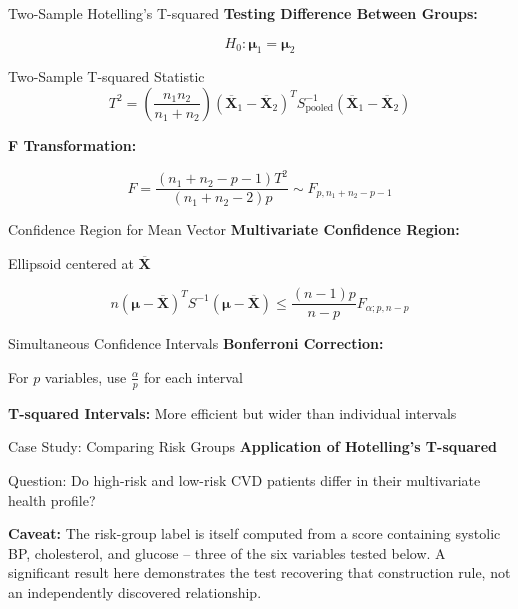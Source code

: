 \documentclass[aspectratio=169,ignorenonframetext]{beamer}
\begin{document}
\begin{frame}{Two-Sample Hotelling's T-squared}
\textbf{Testing Difference Between Groups:}

\[H_{0}:\mathbf{\mu}_{1} = \mathbf{\mu}_{2}\]
\end{frame}

\begin{frame}{Two-Sample T-squared Statistic}
\[T^{2} = \left( \frac{n_{1}n_{2}}{n_{1} + n_{2}} \right)\left( {\overline{\mathbf{X}}}_{1} - {\overline{\mathbf{X}}}_{2} \right)^{T}S_{\text{pooled}}^{- 1}\left( {\overline{\mathbf{X}}}_{1} - {\overline{\mathbf{X}}}_{2} \right)\]

\textbf{F Transformation:}

\[F = \frac{\left( n_{1} + n_{2} - p - 1 \right)T^{2}}{\left( n_{1} + n_{2} - 2 \right)p} \sim F_{p,n_{1} + n_{2} - p - 1}\]
\end{frame}

\begin{frame}{Confidence Region for Mean Vector}
\textbf{Multivariate Confidence Region:}

Ellipsoid centered at \(\overline{\mathbf{X}}\)

\[{n\left( \mathbf{\mu} - \overline{\mathbf{X}} \right)}^{T}S^{- 1}\left( \mathbf{\mu} - \overline{\mathbf{X}} \right) \leq \frac{(n - 1)p}{n - p}F_{\alpha;p,n - p}\]
\end{frame}

\begin{frame}{Simultaneous Confidence Intervals}
\textbf{Bonferroni Correction:}

For \(p\) variables, use \(\frac{\alpha}{p}\) for each interval

\textbf{T-squared Intervals:} More efficient but wider than individual
intervals
\end{frame}

\begin{frame}{Case Study: Comparing Risk Groups}
\textbf{Application of Hotelling's T-squared}

Question: Do high-risk and low-risk CVD patients differ in their
multivariate health profile?

\textbf{Caveat:} The risk-group label is itself computed from a score
containing systolic BP, cholesterol, and glucose -- three of the six
variables tested below. A significant result here demonstrates the test
recovering that construction rule, not an independently discovered
relationship.
\end{frame}
\end{document}
